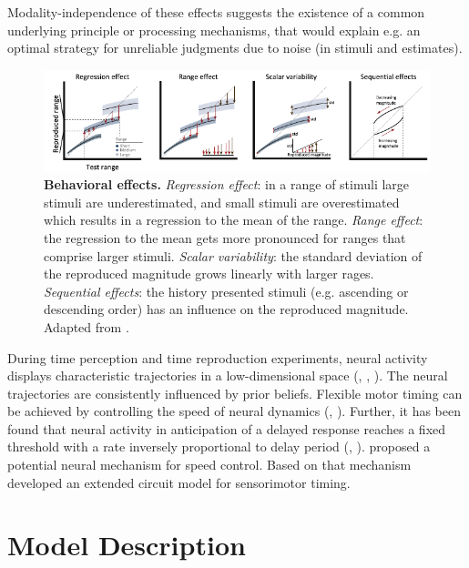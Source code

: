 \documentclass[10pt]{article}
\begin{document}
Modality-independence of these effects suggests the existence of a common underlying principle or processing mechanisms, that would explain e.g. an optimal strategy for unreliable judgments due to noise (in stimuli and estimates).

\begin{figure}[ht]
	\centering
	\includegraphics[width=\textwidth]{figures/behavioural_effects_petzschner.pdf}
	\caption{\textbf{Behavioral effects.} 
	\textit{Regression effect}: in a range of stimuli large stimuli are underestimated, and small stimuli are overestimated which results in a regression to the mean of the range.
	\textit{Range effect}: the regression to the mean gets more pronounced for ranges that comprise larger stimuli. 
	\textit{Scalar variability}: the standard deviation of the reproduced magnitude grows linearly with larger rages. 
	\textit{Sequential effects}: the history presented stimuli (e.g. ascending or descending order) has an influence on the reproduced magnitude. 
	Adapted from \cite{Petzschner2015}.}
	\label{fig:behavioraleffects}
\end{figure}

During time perception and time reproduction experiments, neural activity displays characteristic trajectories in a low-dimensional space (\cite{Wang2018}, \cite{Henke2021}, \cite{Meirhaeghe2021}). 
The neural trajectories are consistently influenced by prior beliefs. 
Flexible motor timing can be achieved by controlling the speed of neural dynamics (\cite{Sohn2019}, \cite{Wang2018}). 
Further, it has been found that neural activity in anticipation of a delayed response reaches a fixed threshold with a rate inversely proportional to delay period (\cite{Murakami2014}, \cite{Mita2009}).
\cite{Wang2018} proposed a potential neural mechanism for speed control. Based on that mechanism \cite{Egger2020} developed an extended circuit model for sensorimotor timing.

\section{Model Description}
\end{document}
